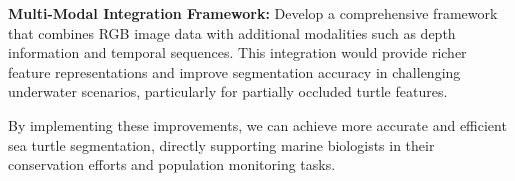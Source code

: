 \documentclass[conference]{IEEEtran}
\begin{document}
\textbf{Multi-Modal Integration Framework:} Develop a comprehensive framework that combines RGB image data with additional modalities such as depth information and temporal sequences. This integration would provide richer feature representations and improve segmentation accuracy in challenging underwater scenarios, particularly for partially occluded turtle features.
 
By implementing these improvements, we can achieve more accurate and efficient sea turtle segmentation, directly supporting marine biologists in their conservation efforts and population monitoring tasks.
\small
\printbibliography
\nocite{*}
\normalsize
\end{document}
